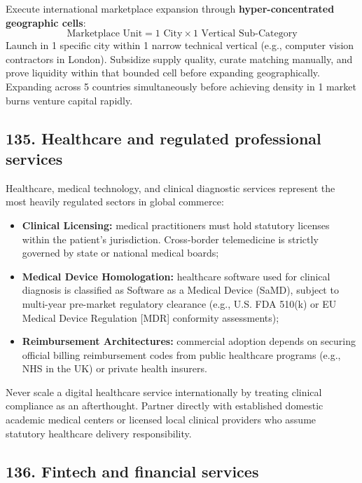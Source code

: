 Execute international marketplace expansion through \textbf{hyper-concentrated geographic cells}:
\begin{equation}
\text{Marketplace Unit} = 1 \text{ City} \times 1 \text{ Vertical Sub-Category}
\end{equation}
Launch in 1 specific city within 1 narrow technical vertical (e.g., computer vision contractors in London). Subsidize supply quality, curate matching manually, and prove liquidity within that bounded cell before expanding geographically. Expanding across 5 countries simultaneously before achieving density in 1 market burns venture capital rapidly.

\subsection{135. Healthcare and regulated professional services}

Healthcare, medical technology, and clinical diagnostic services represent the most heavily regulated sectors in global commerce:
\begin{itemize}
    \item \textbf{Clinical Licensing:} medical practitioners must hold statutory licenses within the patient's jurisdiction. Cross-border telemedicine is strictly governed by state or national medical boards;
    \item \textbf{Medical Device Homologation:} healthcare software used for clinical diagnosis is classified as Software as a Medical Device (SaMD), subject to multi-year pre-market regulatory clearance (e.g., U.S. FDA 510(k) or EU Medical Device Regulation [MDR] conformity assessments);
    \item \textbf{Reimbursement Architectures:} commercial adoption depends on securing official billing reimbursement codes from public healthcare programs (e.g., NHS in the UK) or private health insurers.
\end{itemize}
Never scale a digital healthcare service internationally by treating clinical compliance as an afterthought. Partner directly with established domestic academic medical centers or licensed local clinical providers who assume statutory healthcare delivery responsibility.

\subsection{136. Fintech and financial services}

